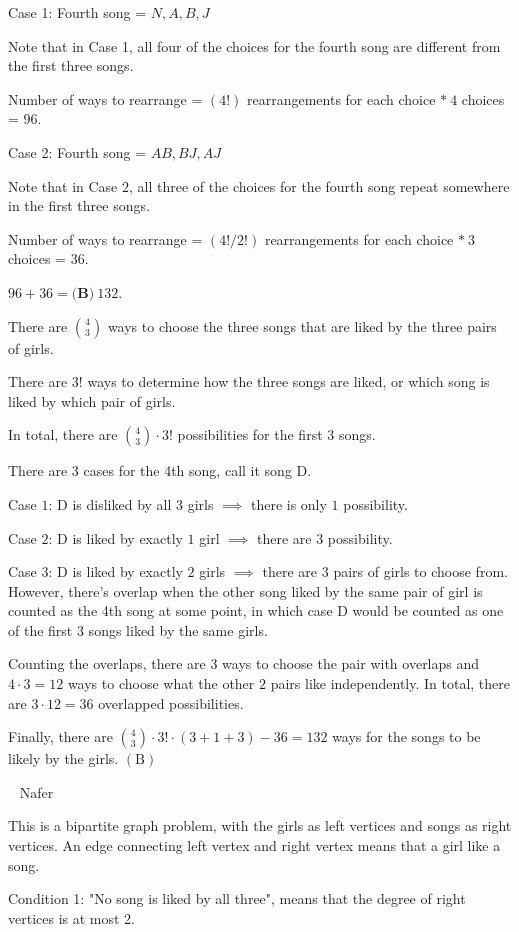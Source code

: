 \documentclass{article}%
\begin{document}
\begin{enumerate}
Case 1: Fourth song = $N, A, B, J$

Note that in Case 1, all four of the choices for the fourth song are different from the first three songs.

Number of ways to rearrange = $(4!)$ rearrangements for each choice $*\: 4$ choices = $96$.

Case 2: Fourth song = $AB, BJ, AJ$

Note that in Case $2$, all three of the choices for the fourth song repeat somewhere in the first three songs.

Number of ways to rearrange = $(4!/2!)$ rearrangements for each choice $*\: 3$ choices = $36$.

$96 + 36 = \boxed{\textbf{(B)} \: 132}$.

There are $\binom{4}{3}$ ways to choose the three songs that are liked by the three pairs of girls.

There are $3!$ ways to determine how the three songs are liked, or which song is liked by which pair of girls.

In total, there are $\binom{4}{3}\cdot3!$ possibilities for the first $3$ songs.

There are $3$ cases for the 4th song, call it song D.

Case $1$: D is disliked by all $3$ girls $\implies$ there is only $1$ possibility.

Case $2$: D is liked by exactly $1$ girl $\implies$ there are $3$ possibility.

Case $3$: D is liked by exactly $2$ girls $\implies$ there are $3$ pairs of girls to choose from. However, there's overlap when the other song liked by the same pair of girl is counted as the 4th song at some point, in which case D would be counted as one of the first $3$ songs liked by the same girls.

Counting the overlaps, there are $3$ ways to choose the pair with overlaps and $4\cdot3=12$ ways to choose what the other $2$ pairs like independently. In total, there are $3\cdot12=36$ overlapped possibilities.

Finally, there are $\binom{4}{3}\cdot3!\cdot(3+1+3)-36=132$ ways for the songs to be likely by the girls. $\boxed{\mathrm{(B)}}$

~ Nafer

This is a bipartite graph problem, with the girls as left vertices and songs as right vertices. An edge connecting left vertex and right vertex means that a girl like a song.

Condition 1: "No song is liked by all three", means that the degree of right vertices is at most 2. 


\end{enumerate}
\end{document}
